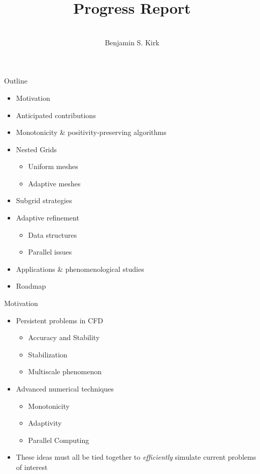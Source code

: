 \documentclass[landscape,pdftex,headrule,footrule]{foils}
\title{Progress Report}
\author{\vspace{1in} \\ Benjamin S. Kirk}
\begin{document}
\maketitle


\begin{foil}{Outline}
  \begin{itemize}
    \tightlist
    \item Motivation
    \item Anticipated contributions
    \item Monotonicity \& positivity-preserving algorithms
    \item Nested Grids 
      \begin{itemize}
	\item Uniform meshes
	\item Adaptive meshes
      \end{itemize}
    \item Subgrid strategies
    \item Adaptive refinement
      \begin{itemize}
	\item Data structures
	\item Parallel issues
      \end{itemize}
    \item Applications \& phenomenological studies
    \item Roadmap
  \end{itemize}
\end{foil}


\begin{foil}{Motivation}
  \begin{itemize}
    \tightlist
    \item Persistent problems in CFD
      \begin{itemize}
	\item Accuracy and Stability
	\item Stabilization
	\item Multiscale phenomenon
      \end{itemize}
    \item Advanced numerical techniques
      \begin{itemize}
        \item Monotonicity
	\item Adaptivity
	\item Parallel Computing
      \end{itemize}
    \item These ideas must all be tied together to \emph{efficiently} simulate current problems of interest 
  \end{itemize}
\end{foil}
\end{document}
